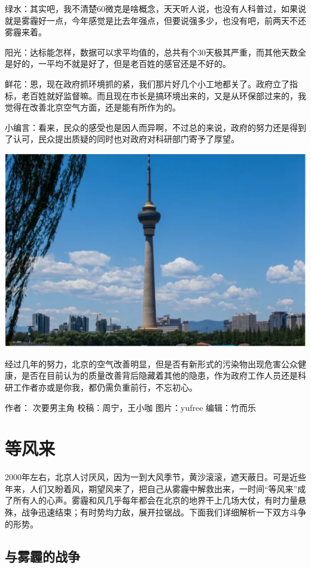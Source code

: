 \documentclass[]{book}
\begin{document}
绿水：其实吧，我不清楚60微克是啥概念，天天听人说，也没有人科普过，如果说就是雾霾好一点，今年感觉是比去年强点，但要说强多少，也没有吧，前两天不还雾霾来着。

阳光：达标能怎样，数据可以求平均值的，总共有个30天极其严重，而其他天数全是好的，一平均不就是好了，但是老百姓的感官还是不好的。

鲜花：恩，现在政府抓环境抓的紧，我们那片好几个小工地都关了。政府立了指标，老百姓就好监督嘛。而且现在市长是搞环境出来的，又是从环保部过来的，我觉得在改善北京空气方面，还是能有所作为的。

小编言：看来，民众的感受也是因人而异啊，不过总的来说，政府的努力还是得到了认可，民众提出质疑的同时也对政府对科研部门寄予了厚望。

\includegraphics[width=8.33in]{images/air5}

经过几年的努力，北京的空气改善明显，但是否有新形式的污染物出现危害公众健康，是否在目前认为的质量改善背后隐藏着其他的隐患，作为政府工作人员还是科研工作者亦或是你我，都仍需负重前行，不忘初心。

作者： 次要男主角 校稿：周宁，王小咖 图片：yufree 编辑：竹而乐

\section{等风来}

2000年左右，北京人讨厌风，因为一到大风季节，黄沙滚滚，遮天蔽日。可是近些年来，人们又盼着风，期望风来了，把自己从雾霾中解救出来，一时间``等风来''成了所有人的心声。雾霾和风几乎每年都会在北京的地界干上几场大仗，有时力量悬殊，战争迅速结束；有时势均力敌，展开拉锯战。下面我们详细解析一下双方斗争的形势。

\subsection{与雾霾的战争}
\end{document}
